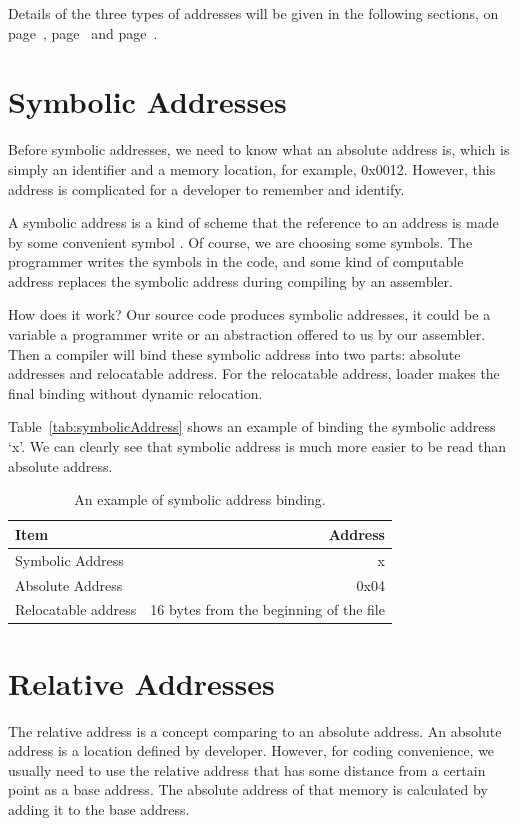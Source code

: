 \documentclass[doc,natbib,12pt]{apa6}
\begin{document}
	Details of the three types of addresses will be given in the following sections, on page~\pageref{chp:symbolicAddress}, page~\pageref{chp:relativeAddress} and page~\pageref{chp:physicalAddress}.
	
	\newpage
	\section{Symbolic Addresses} \label{chp:symbolicAddress}
	
	Before symbolic addresses, we need to know what an absolute address is, which is simply an identifier and a memory location, for example, 0x0012. However, this address is complicated for a developer to remember and identify.
	
	A symbolic address is a kind of scheme that the reference to an address is made by some convenient symbol \citep{Oxford2004}. Of course, we are choosing some symbols. The programmer writes the symbols in the code, and some kind of computable address replaces the symbolic address during compiling by an assembler.
	
	How does it work? Our source code produces symbolic addresses, it could be a variable a programmer write or an abstraction offered to us by our assembler. Then a compiler will bind these symbolic address into two parts: absolute addresses and relocatable address. For the relocatable address, loader makes the final binding without dynamic relocation.
	
	Table~\vref{tab:symbolicAddress} shows an example of binding the symbolic address `x'. We can clearly see that symbolic address is much more easier to be read than absolute address.
	
	\begin{table}[h]
		\centering
		\begin{tabular}{l|r}
			Item & Address \\\hline
			Symbolic Address & x \\
			Absolute Address & 0x04  \\
			Relocatable address & 16 bytes from the beginning of the file
		\end{tabular}
		\caption{\label{tab:symbolicAddress}An example of symbolic address binding.}
	\end{table}
	
	\newpage
	\section{Relative Addresses} \label{chp:relativeAddress}
	The relative address is a concept comparing to an absolute address. An absolute address is a location defined by developer. However, for coding convenience, we usually need to use the relative address that has some distance from a certain point as a base address. The absolute address of that memory is calculated by adding it to the base address.
	
\end{document}
